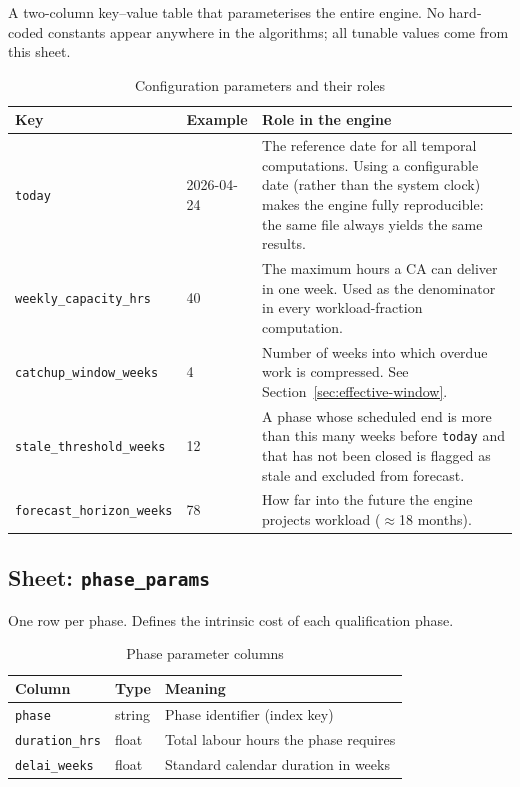 \documentclass[12pt,a4paper]{report}
\begin{document}
A two-column key--value table that parameterises the entire engine.
No hard-coded constants appear anywhere in the algorithms; all tunable
values come from this sheet.

\begin{table}[H]
\centering
\caption{Configuration parameters and their roles}
\begin{tabularx}{\linewidth}{@{} l l X @{}}
\toprule
\textbf{Key} & \textbf{Example} & \textbf{Role in the engine} \\
\midrule
\texttt{today} & 2026-04-24 &
  The reference date for all temporal computations. Using a
  configurable date (rather than the system clock) makes the engine
  fully reproducible: the same file always yields the same results. \\[4pt]
\texttt{weekly\_capacity\_hrs} & 40 &
  The maximum hours a CA can deliver in one week. Used as the
  denominator in every workload-fraction computation. \\[4pt]
\texttt{catchup\_window\_weeks} & 4 &
  Number of weeks into which overdue work is compressed. See
  Section~\ref{sec:effective-window}. \\[4pt]
\texttt{stale\_threshold\_weeks} & 12 &
  A phase whose scheduled end is more than this many weeks before
  \texttt{today} and that has not been closed is flagged as stale
  and excluded from forecast. \\[4pt]
\texttt{forecast\_horizon\_weeks} & 78 &
  How far into the future the engine projects workload ($\approx$18
  months). \\
\bottomrule
\end{tabularx}
\end{table}

\subsection{Sheet: \texttt{phase\_params}}

One row per phase. Defines the intrinsic cost of each qualification phase.

\begin{table}[H]
\centering
\caption{Phase parameter columns}
\begin{tabular}{@{} l l l @{}}
\toprule
\textbf{Column} & \textbf{Type} & \textbf{Meaning} \\
\midrule
\texttt{phase}         & string  & Phase identifier (index key) \\
\texttt{duration\_hrs} & float   & Total labour hours the phase requires \\
\texttt{delai\_weeks}  & float   & Standard calendar duration in weeks \\
\bottomrule
\end{tabular}
\end{table}
\end{document}
